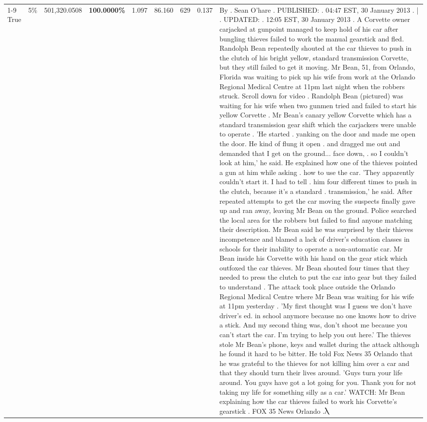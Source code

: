 \begin{table}[H]
\begin{tabular}{lllrlllll}
\cline{1-9} \cline{2-9}
True & 5\% & 501,320.0508 & \bfseries \color{red} 100.0000\% & 1.097 & 86.160 & 629 & 0.137 & By . Sean O'hare . PUBLISHED: . 04:47 EST, 30 January 2013 . | . UPDATED: . 12:05 EST, 30 January 2013 . A Corvette owner carjacked at gunpoint managed to keep hold of his car after bungling thieves failed to work the manual gearstick and fled. Randolph Bean repeatedly shouted at the car thieves to push in the clutch of his bright yellow, standard transmission Corvette, but they still failed to get it moving. Mr Bean, 51, from Orlando, Florida was waiting to pick up his wife from work at the Orlando Regional Medical Centre at 11pm last night when the robbers struck. Scroll down for video . Randolph Bean (pictured) was waiting for his wife when two gunmen tried and failed to start his yellow Corvette . Mr Bean's canary yellow Corvette which has a standard transmission gear shift which the carjackers were unable to operate . 'He started . yanking on the door and made me open the door. He kind of flung it open . and dragged me out and demanded that I get on the ground... face down, . so I couldn't look at him,' he said. He explained how one of the thieves pointed a gun at him while asking . how to use the car. 'They apparently couldn't start it. I had to tell . him four different times to push in the clutch, because it's a standard . transmission,' he said. After repeated attempts to get the car moving the suspects finally gave up and ran away, leaving Mr Bean on the ground. Police searched the local area for the robbers but failed to find anyone matching their description. Mr Bean said he was surprised by their thieves incompetence and blamed a lack of driver's education classes in schools for their inability to operate a non-automatic car. Mr Bean inside his Corvette with his hand on the gear stick which outfoxed the car thieves. Mr Bean shouted four times that they needed to press the clutch to put the car into gear but they failed to understand . The attack took place outside the Orlando Regional Medical Centre where Mr Bean was waiting for his wife at 11pm yesterday . 'My first thought was I guess we don't have driver's ed. in school anymore because no one knows how to drive a stick. And my second thing was, don't shoot me because you can't start the car. I'm trying to help you out here.' The thieves stole Mr Bean's phone, keys and wallet during the attack although he found it hard to be bitter. He told Fox News 35 Orlando that he was grateful to the thieves for not killing him over a car and that they should turn their lives around. 'Guys turn your life around. You guys have got a lot going for you. Thank you for not taking my life for something silly as a car.' WATCH: Mr Bean explaining how the car thieves failed to work his Corvette's gearstick . FOX 35 News Orlando .Ⲗ \\

\end{tabular}
\end{table}

